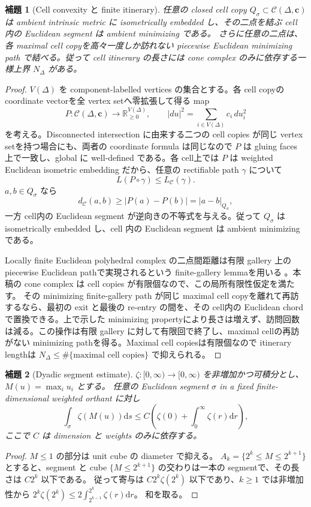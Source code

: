 \documentclass[11pt,a4paper]{ltjsarticle}
\newcommand{\RR}{\mathbb R}
\newcommand{\dd}{\mathrm d}
\newcommand{\cC}{\mathcal C}
\theoremstyle{plain}
\newtheorem{lemma}[lemma]{補題}
\theoremstyle{definition}
\theoremstyle{remark}
\begin{document}
\begin{lemma}[Cell convexity と finite itinerary]
\label{lem:cell-convex}
任意の closed cell copy $Q_\sigma\subset\cC(\Delta,\bm c)$ は ambient intrinsic metric に isometrically embedded し、その二点を結ぶ cell 内の Euclidean segment は ambient minimizing である。
さらに任意の二点は、各 maximal cell copyを高々一度しか訪れない piecewise Euclidean minimizing path で結べる。従って cell itinerary の長さには cone complex のみに依存する一様上界 $N_\Delta$ がある。
\end{lemma}
\begin{proof}
$V(\Delta)$ を component-labelled vertices の集合とする。各 cell copyの coordinate vectorを全 vertex setへ零拡張して得る map
\[
 P:\cC(\Delta,\bm c)\longrightarrow
 \RR_{\ge0}^{V(\Delta)},
 \qquad
 |du|^2=\sum_{i\in V(\Delta)}c_i\,du_i^2
\]
を考える。Disconnected intersection に由来する二つの cell copies が同じ vertex setを持つ場合にも、両者の coordinate formula は同じなので $P$ は gluing faces 上で一致し、global に well-defined である。各 cell上では $P$ は weighted Euclidean isometric embedding だから、任意の rectifiable path $\gamma$ について
\[
 L(P\circ\gamma)\le L_{\cC}(\gamma).
\]
$a,b\in Q_\sigma$ なら
\[
 d_{\cC}(a,b)\ge |P(a)-P(b)|=|a-b|_{Q_\sigma},
\]
一方 cell内の Euclidean segment が逆向きの不等式を与える。従って $Q_\sigma$ は isometrically embedded し、cell 内の Euclidean segment は ambient minimizing である。

Locally finite Euclidean polyhedral complex の二点間距離は有限 gallery 上の piecewise Euclidean pathで実現されるという finite-gallery lemmaを用いる
\cite[Chapter~I.7]{BridsonHaefliger}。本稿の cone complex は cell copies が有限個なので、この局所有限性仮定を満たす。
その minimizing finite-gallery path が同じ maximal cell copyを離れて再訪するなら、最初の exit と最後の re-entry の間を、その cell内の Euclidean chordで置換できる。上で示した minimizing propertyにより長さは増えず、訪問回数は減る。この操作は有限 gallery に対して有限回で終了し、maximal cellの再訪がない minimizing pathを得る。Maximal cell copiesは有限個なので itinerary lengthは $N_\Delta\le \#\{\text{maximal cell copies}\}$ で抑えられる。
\end{proof}

\begin{lemma}[Dyadic segment estimate]
\label{lem:dyadic}
$\zeta:[0,\infty)\to[0,\infty)$ を非増加かつ可積分とし、$M(u)=\max_i u_i$ とする。
任意の Euclidean segment $\sigma$ in a fixed finite-dimensional weighted orthant に対し
\[
 \int_\sigma\zeta(M(u))\dd s
 \le C\left(\zeta(0)+\int_0^\infty\zeta(r)\dd r\right),
\]
ここで $C$ は dimension と weights のみに依存する。
\end{lemma}
\begin{proof}
$M\le1$ の部分は unit cube の diameter で抑える。
$A_k=\{2^k\le M\le2^{k+1}\}$ とすると、segment と cube $\{M\le2^{k+1}\}$ の交わりは一本の segmentで、その長さは $C2^k$ 以下である。
従って寄与は $C2^k\zeta(2^k)$ 以下であり、$k\ge1$ では非増加性から
$2^k\zeta(2^k)\le2\int_{2^{k-1}}^{2^k}\zeta(r)\dd r$。
和を取る。
\end{proof}
\end{document}
